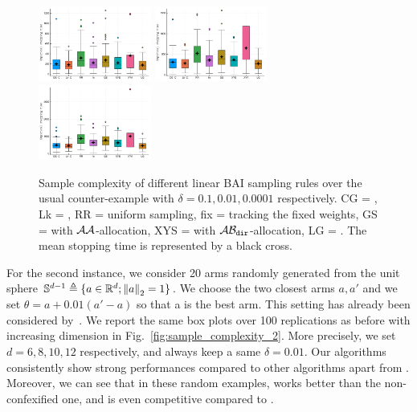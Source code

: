 \begin{figure}[ht]
 \centering
 \includegraphics[clip, width= 0.33\textwidth]{Chapter4/img/bai_sin_0-1}
 \includegraphics[clip, width= 0.33\textwidth]{Chapter4/img/bai_sin_0-01}
 \includegraphics[clip, width= 0.33\textwidth]{Chapter4/img/bai_sin_0-0001}
 \caption{Sample complexity of different linear BAI sampling rules over the usual counter-example with $\delta=0.1, 0.01, 0.0001$ respectively. CG = \LGC,  Lk = \LG, RR = uniform sampling, fix = tracking the fixed weights, GS = \XYS with $\mathcal{A}\mathcal{A}$-allocation, XYS = \XYS with $\mathcal{A}\mathcal{B}_{\texttt{dir}}$-allocation, LG = \LGapE. The mean stopping time is represented by a black cross.}
 \label{fig:sample_complexity_1}
\end{figure}

For the second instance, we consider 20 arms randomly generated from the unit sphere $\mathbb{S}^{d-1}\triangleq\{a\in\mathbb{R}^d; \left\lVert a\right\rVert_2=1\}$. We choose the two closest arms $a, a'$ and we set $\theta = a + 0.01(a'-a)$ so that a is the best arm. This setting has already been considered by~\citet{tao2018alba}. We report the same box plots over 100 replications as before with increasing dimension in Fig.~\ref{fig:sample_complexity_2}. More precisely, we set $d=6, 8, 10, 12$ respectively, and always keep a same $\delta = 0.01$. Our algorithms consistently show strong performances compared to other algorithms apart from \LGapE. Moreover, we can see that in these random examples, \LGC works better than the non-confexified one, and is even competitive compared to \LGapE.


